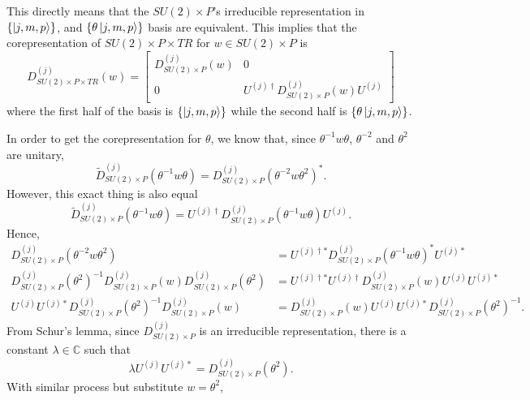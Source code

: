 \documentclass[preprint, 12pt]{revtex4-2}
\numberwithin{equation}{section}
\begin{document}
This directly means that the $SU(2)\times P$'s irreducible representation in $\{\ket{j, m, p}\}$, and $\{\theta\ket{j, m, p}\}$ basis are equivalent. This implies that the corepresentation of $SU(2)\times P\times TR$ for $w\in SU(2)\times P$ is
\begin{equation}
    D_{SU(2)\times P\times TR}^{(j)}(w) = 
    \begin{bmatrix}
        D^{(j)}_{SU(2)\times P}(w) & 0 \\
        0 & U^{(j)\dagger}D^{(j)}_{SU(2)\times P}(w)U^{(j)}
    \end{bmatrix}
\end{equation}
where the first half of the basis is $\{\ket{j, m, p}\}$ while the second half is $\{\theta\ket{j, m, p}\}$.

In order to get the corepresentation for $\theta$, we know that, since $\theta^{-1}w\theta$, $\theta^{-2}$ and $\theta^{2}$ are unitary,
\begin{equation}
    \tilde{D}^{(j)}_{SU(2)\times P}(\theta^{-1}w\theta) = D^{(j)}_{SU(2)\times P}(\theta^{-2}w\theta^2)^\ast.
\end{equation}
However, this exact thing is also equal
\begin{equation}
    \tilde{D}^{(j)}_{SU(2)\times P}(\theta^{-1}w\theta) = U^{(j)\dagger}D^{(j)}_{SU(2)\times P}(\theta^{-1}w\theta)U^{(j)}.
\end{equation}
Hence,
\begin{equation}
    \begin{aligned}
        D^{(j)}_{SU(2)\times P}(\theta^{-2}w\theta^2) &= U^{(j)\dagger\ast}D^{(j)}_{SU(2)\times P}(\theta^{-1}w\theta)^\ast U^{(j)\ast} \\
        D^{(j)}_{SU(2)\times P}(\theta^{2})^{-1}D^{(j)}_{SU(2)\times P}(w)D^{(j)}_{SU(2)\times P}(\theta^2)&= U^{(j)\dagger\ast}U^{(j)\dagger}D^{(j)}_{SU(2)\times P}(w)U^{(j)}U^{(j)\ast} \\
        U^{(j)}U^{(j)\ast}D^{(j)}_{SU(2)\times P}(\theta^{2})^{-1}D^{(j)}_{SU(2)\times P}(w) &= D^{(j)}_{SU(2)\times P}(w)U^{(j)}U^{(j)\ast}D^{(j)}_{SU(2)\times P}(\theta^2)^{-1}.
    \end{aligned}
\end{equation}
From Schur's lemma, since $D^{(j)}_{SU(2)\times P}$ is an irreducible representation, there is a constant $\lambda\in\mathbb{C}$ such that
\begin{equation}
    \lambda U^{(j)}U^{(j)\ast} = D^{(j)}_{SU(2)\times P}(\theta^{2}).
\end{equation}
With similar process but substitute $w=\theta^2$,
\end{document}
